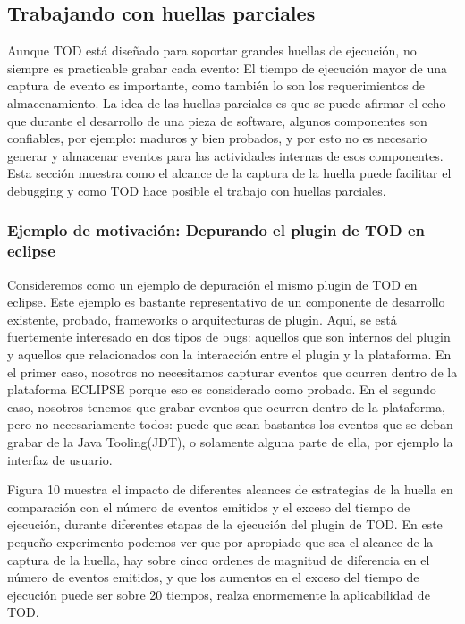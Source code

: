 \documentclass[12pt,legalpaper]{report}
\begin{document}
		\subsection{Trabajando con huellas parciales}

	Aunque TOD está diseñado para soportar grandes huellas de ejecución, no siempre es practicable grabar cada evento:  El tiempo de ejecución mayor de una captura de evento es importante, como también lo son los requerimientos de almacenamiento.  La idea de las huellas parciales es que se puede afirmar el echo que durante el desarrollo de una pieza de software, algunos componentes son confiables, por ejemplo: maduros y bien probados, y por esto no es necesario generar y almacenar eventos para las actividades internas de esos componentes.  Esta sección muestra como el alcance de la captura de la huella puede facilitar el debugging y como TOD hace posible el trabajo con huellas parciales.

			\subsubsection[Ejemplo de motivación]{Ejemplo de motivación: Depurando el plugin de TOD en eclipse}

Consideremos como un ejemplo de depuración el mismo plugin de TOD en eclipse.  Este ejemplo es bastante representativo de un componente de desarrollo existente, probado, frameworks o arquitecturas de plugin.  Aquí, se está fuertemente interesado en dos tipos de bugs:  aquellos que son internos del plugin y aquellos que relacionados con la interacción entre el plugin y la plataforma.  En el primer caso, nosotros no necesitamos capturar eventos que ocurren dentro de la plataforma ECLIPSE porque eso es considerado como probado.  En el segundo caso, nosotros tenemos que grabar eventos que ocurren dentro de la plataforma, pero no necesariamente todos:  puede que sean bastantes los eventos que se deban grabar de la Java Tooling(JDT), o solamente alguna parte de ella, por ejemplo la interfaz de usuario.

Figura 10 muestra el impacto de diferentes alcances de estrategias de la huella en comparación con el número de eventos emitidos y el exceso del tiempo de ejecución, durante diferentes etapas de la ejecución del plugin de TOD.  En este pequeño experimento podemos ver que por apropiado que sea el alcance de la captura de la huella, hay sobre cinco ordenes de magnitud de diferencia en el número de eventos emitidos, y que los aumentos en el exceso del tiempo de ejecución puede ser sobre 20 tiempos, realza enormemente la aplicabilidad de TOD.
\end{document}
